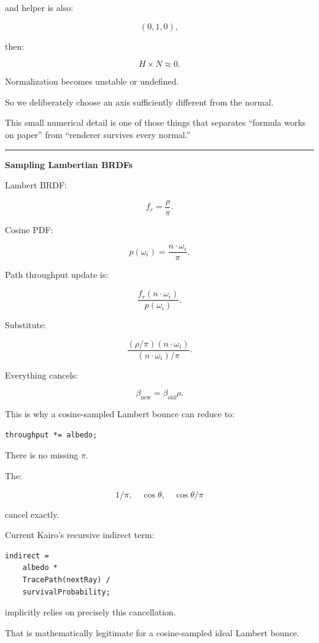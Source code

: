 and helper is also:

\[
(0,1,0),
\]

then:

\[
H\times N\approx0.
\]

Normalization becomes unstable or undefined.

So we deliberately choose an axis sufficiently different from the normal.

This small numerical detail is one of those things that separates ``formula works on paper'' from ``renderer survives every normal.''

\begin{center}\rule{0.5\linewidth}{0.5pt}\end{center}

\textbf{Sampling Lambertian BRDFs}

Lambert BRDF:

\[
f_r=\frac{\rho}{\pi}.
\]

Cosine PDF:

\[
p(\omega_i)
=
\frac{n\cdot\omega_i}{\pi}.
\]

Path throughput update is:

\[
\frac{
f_r
(n\cdot\omega_i)
}{
p(\omega_i)
}.
\]

Substitute:

\[
\frac{
(\rho/\pi)
(n\cdot\omega_i)
}{
(n\cdot\omega_i)/\pi
}.
\]

Everything cancels:

\[
\boxed{
\beta_{\text{new}}
=
\beta_{\text{old}}\rho.
}
\]

This is why a cosine-sampled Lambert bounce can reduce to:

\begin{verbatim}
throughput *= albedo;
\end{verbatim}

There is no missing \(\pi\).

The:

\[
1/\pi,
\quad
\cos\theta,
\quad
\cos\theta/\pi
\]

cancel exactly.

Current Kairo's recursive indirect term:

\begin{verbatim}
indirect =
    albedo *
    TracePath(nextRay) /
    survivalProbability;
\end{verbatim}

implicitly relies on precisely this cancellation.

That is mathematically legitimate for a cosine-sampled ideal Lambert bounce.


